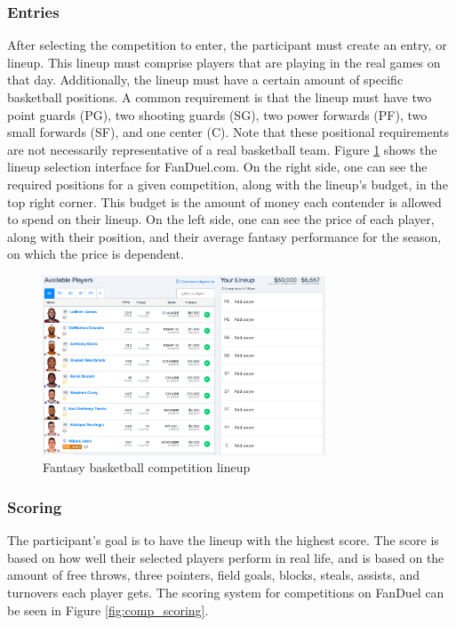 \subsubsection{Entries}
After selecting the competition to enter, the participant must create an entry, or lineup. This lineup must comprise players that are playing in the real games on that day. Additionally, the lineup must have a certain amount of specific basketball positions. A common requirement is that the lineup must have two point guards (PG), two shooting guards (SG), two power forwards (PF), two small forwards (SF), and one center (C). Note that these positional requirements are not necessarily representative of a real basketball team. Figure \ref{fig:comp_lineup} shows the lineup selection interface for FanDuel.com. On the right side, one can see the required positions for a given competition, along with the lineup's budget, in the top right corner. This budget is the amount of money each contender is allowed to spend on their lineup. On the left side, one can see the price of each player, along with their position, and their average fantasy performance for the season, on which the price is dependent.

\begin{figure}[ht]
    \centering
    \includegraphics[width=0.75\textwidth]{figures/fantasy_competition_lineup}
    \caption{Fantasy basketball competition lineup}
    \label{fig:comp_lineup}
\end{figure}

\subsubsection{Scoring}
The participant's goal is to have the lineup with the highest score. The score is based on how well their selected players perform in real life, and is based on the amount of free throws, three pointers, field goals, blocks, steals, assists, and turnovers each player gets. The scoring system for competitions on FanDuel can be seen in Figure \ref{fig:comp_scoring}.

